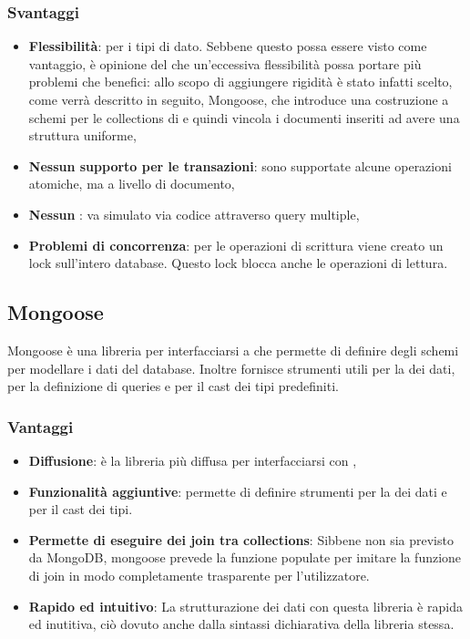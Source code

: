 \subsubsection{Svantaggi}
\begin{itemize}
\item \textbf{Flessibilità}: per i tipi di dato. Sebbene questo possa essere visto come vantaggio, è opinione del  che un'eccessiva flessibilità possa portare più problemi che benefici: allo scopo di aggiungere rigidità è stato infatti scelto, come verrà descritto in seguito, Mongoose, che introduce una costruzione a schemi per le collections di  e quindi vincola i documenti inseriti ad avere una struttura uniforme,
\item \textbf{Nessun supporto per le transazioni}: sono supportate alcune operazioni atomiche, ma a livello di documento,
\item \textbf{Nessun }: va simulato via codice attraverso query multiple,
\item \textbf{Problemi di concorrenza}: per le operazioni di scrittura viene creato un lock sull'intero database. Questo lock blocca anche le operazioni di lettura.
\end{itemize}

\subsection{Mongoose}
Mongoose \`e una libreria per interfacciarsi a  che permette di definire degli schemi per modellare i dati del database. Inoltre fornisce strumenti utili per la  dei dati, per la definizione di queries e per il cast dei tipi predefiniti. \\
\subsubsection{Vantaggi}
\begin{itemize}
\item \textbf{Diffusione}: \`e la libreria pi\`u diffusa per interfacciarsi con ,
\item \textbf{Funzionalit\`a aggiuntive}: permette di definire strumenti per la  dei dati e per il cast dei tipi.
\item \textbf{Permette di eseguire dei join tra collections}: Sibbene non sia previsto da MongoDB, mongoose prevede la funzione populate per imitare la funzione di join in modo completamente trasparente per l'utilizzatore.
\item \textbf{Rapido ed intuitivo}: La strutturazione dei dati con questa libreria è rapida ed inutitiva, ciò dovuto anche dalla sintassi dichiarativa della libreria stessa.
\end{itemize}
